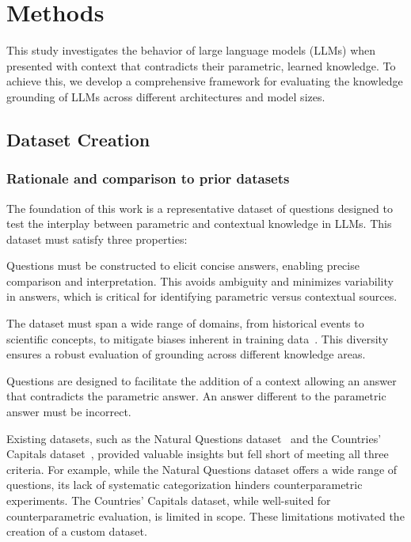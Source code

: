 \section{Methods}
\label{methodology_section}


This study investigates the behavior of large language models (LLMs) when presented with context that contradicts their parametric, learned knowledge.
To achieve this, we develop a comprehensive framework for evaluating the knowledge grounding of LLMs across different architectures and model sizes.

\subsection{Dataset Creation}
\label{dataset_creation}

\subsubsection{Rationale and comparison to prior datasets}

The foundation of this work is a representative dataset of questions designed to test the interplay between parametric and contextual knowledge in LLMs.
This dataset must satisfy three properties:
\begin{description}[style=nextline]
	\item[1. Short, unambiguous answers] Questions must be constructed to elicit concise answers, enabling precise comparison and interpretation.
This avoids ambiguity and minimizes variability in answers, which is critical for identifying parametric versus contextual sources.
	\item[2. Coverage of diverse topics] The dataset must span a wide range of domains, from historical events to scientific concepts, to mitigate biases inherent in training data~\cite{wikipedia_geographic_bias}.
	This diversity ensures a robust evaluation of grounding across different knowledge areas.
	\item[3. Conterparametric compatibility] Questions are designed to facilitate the addition of a context allowing an answer that contradicts the parametric answer.
		An answer different to the parametric answer must be incorrect.
\end{description}

Existing datasets, such as the Natural Questions dataset~\cite{natural_questions} and the Countries' Capitals dataset~\cite{factual_recall}, provided valuable insights but fell short of meeting all three criteria.
For example, while the Natural Questions dataset offers a wide range of questions, its lack of systematic categorization hinders counterparametric experiments.
The Countries' Capitals dataset, while well-suited for counterparametric evaluation, is limited in scope.
These limitations motivated the creation of a custom dataset.

